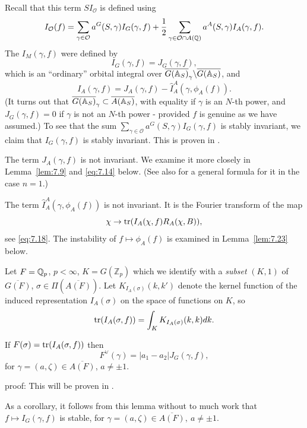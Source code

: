 Recall that this term $SI_{\mathcal{O}}$ is defined using
\begin{equation}\label{eq:7.11}
I_{\mathcal{O}}(f)
=\sum_{\gamma\in {\mathcal{O}}}a^G(S,\gamma)I_G(\gamma,f)
+{1\over 2}\sum_{\gamma\in {\mathcal{O}}\cap A(\mathbb{Q} )}
a^A(S,\gamma)I_A(\gamma,f).
\end{equation}
The $I_M(\gamma,f)$ were defined by
\[
I_G(\gamma,f)=J_G(\gamma,f),
\]
which is an ``ordinary'' orbital integral over
$\overline{G(\mathbb{A} _S)}_\gamma\backslash \overline{G(\mathbb{A} _S)}$, and
\[
I_A(\gamma,f)=J_A(\gamma,f)-\hat{I}_A^A(\gamma,\phi_A(f)).
\]
(It turns out that
$\overline{G(\mathbb{A} _S)}_\gamma\subset \overline{A(\mathbb{A} _S)}$,
with equality if $\gamma$ is an $N$-th power, and
$J_G(\gamma,f)=0$ if $\gamma$ is not an $N$-th power - provided
$f$ is genuine as we have assumed.)
To see that the sum
$\sum_{\gamma\in {\mathcal{O}}}a^G(S,\gamma)I_G(\gamma,f)$
is stably invariant, we claim that $I_G(\gamma,f)$ is stably invariant.
This is proven in \cite{J3}.

The term $J_A(\gamma,f)$ is not invariant. We examine it
more closely in Lemma~\ref{lem:7.9} and \eqref{eq:7.14} below.
(See also \cite[Corollary 4.2]{A16} for a general formula for it
in the case $n=1$.)

The term $\hat{I}_A^A(\gamma,\phi_A(f))$ is not invariant. It is the
Fourier transform of the map
\[
\chi\rightarrow {\rm tr}(I_A(\chi,f)R_A(\chi,B)),
\]
see \eqref{eq:7.18}. The instability of $f\longmapsto \phi_A(f)$ is
examined in Lemma~\ref{lem:7.23} below.

Let $F=\mathbb{Q} _p$, $p<\infty$, $K=G({\mathbb{Z}}_p)$ which we
identify with a {\em subset} $(K,1)$ of $\overline{G(F)}$,
$\sigma\in \Pi(\overline{A(F)})$. Let $K_{I_A(\sigma)}(k,k')$
denote the kernel function of the induced representation
$I_A(\sigma)$ on the space of functions on $K$, so
\begin{equation}\label{eq:7.12}
{\rm tr}(I_A(\sigma,f))
=\int_K K_{I_A(\sigma)}(k,k)dk .
\end{equation}

\begin{lemma}\label{lem:7.7}
If $F(\sigma)={\rm tr}(I_A(\sigma,f))$ then
\[
F^\vee(\gamma)
=|a_1-a_2|J_G(\gamma,f),
\]
for $\gamma =(a,\zeta)\in \overline{A(F)}$, $a\not= \pm 1$.
\end{lemma}

proof: This will be proven in \cite{J3}.

As a corollary, it follows from this lemma without to much work
that $f\longmapsto I_G(\gamma,f)$ is stable, for
$\gamma =(a,\zeta)\in \overline{A(F)},\ a\not= \pm 1$.

